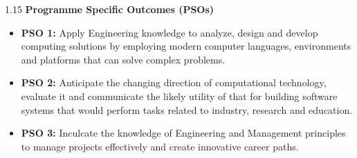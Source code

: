 \begin{spacing}{1.15}
\vspace{0.3cm}
\noindent \textbf{\large Programme Specific Outcomes (PSOs)}\\[0.1cm]
\begin{itemize}
\setlength\itemsep{0.05em}
\item \textbf{PSO 1:} Apply Engineering knowledge to analyze, design and develop computing solutions by employing modern computer languages, environments and platforms that can solve complex problems.
\item \textbf{PSO 2:} Anticipate the changing direction of computational technology, evaluate it and communicate the likely utility of that for building software systems that would perform tasks related to industry, research and education.
\item \textbf{PSO 3:} Inculcate the knowledge of Engineering and Management principles to manage projects effectively and create innovative career paths.
\end{itemize}
\end{spacing}
\clearpage

